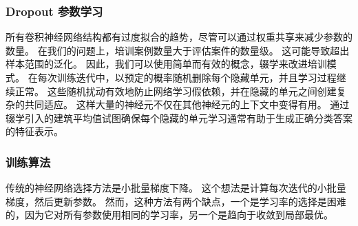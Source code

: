 \subsubsection{Dropout 参数学习}
所有卷积神经网络结构都有过度拟合的趋势，尽管可以通过权重共享来减少参数的数量。 在我们的问题上，培训案例数量大于评估案件的数量级。 这可能导致超出样本范围的泛化。 因此，我们可以使用简单而有效的概念，辍学来改进培训模式。 在每次训练迭代中，以预定的概率随机删除每个隐藏单元，并且学习过程继续正常。 这些随机扰动有效地防止网络学习假依赖，并在隐藏的单元之间创建复杂的共同适应。 这样大量的神经元不仅在其他神经元的上下文中变得有用。 通过辍学引入的建筑平均值试图确保每个隐藏的单元学习通常有助于生成正确分类答案的特征表示。

\subsubsection{训练算法}

传统的神经网络选择方法是小批量梯度下降。 这个想法是计算每次迭代的小批量梯度，然后更新参数。 然而，这种方法有两个缺点，一个是学习率的选择是困难的，因为它对所有参数使用相同的学习率，另一个是趋向于收敛到局部最优。

